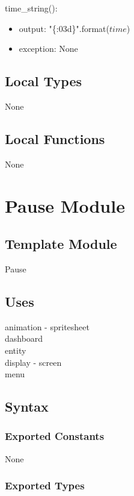 \documentclass[12pt]{article}
\begin{document}
\noindent time\_string():
\begin{itemize}
    \item output: "\{:03d\}".format($time$)
    
    \item exception: None
\end{itemize}

\subsection {Local Types}

None

\subsection {Local Functions}

None

\newpage

\section {Pause Module}

\subsection{Template Module}

Pause

\subsection {Uses}

animation - spritesheet \\
dashboard \\
entity \\
display - screen \\
menu \\

\subsection {Syntax}

\subsubsection {Exported Constants}

None

\subsubsection {Exported Types}
\end{document}
